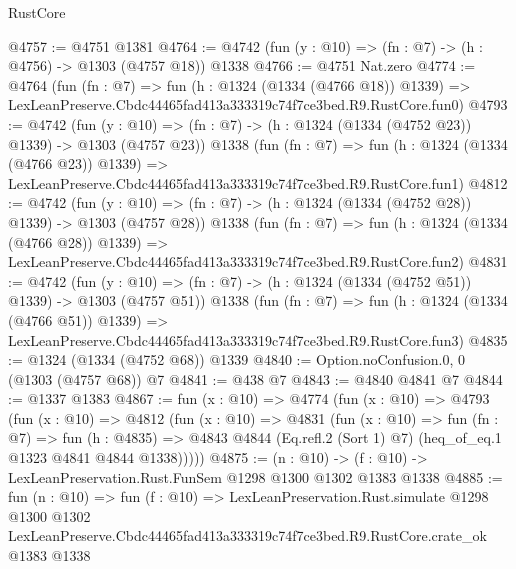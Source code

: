 \begin{lexlean}{RustCore}
\begin{coremodule}
@4757 := @4751 @1381
@4764 := @4742 (fun (y : @10) => (fn : @7) -> (h : @4756) -> @1303 (@4757 @18)) @1338
@4766 := @4751 Nat.zero
@4774 := @4764
    (fun (fn : @7) =>
    fun (h : @1324 (@1334 (@4766 @18)) @1339) =>
    LexLeanPreserve.Cbdc44465fad413a333319c74f7ce3bed.R9.RustCore.fun0)
@4793 := @4742
    (fun (y : @10) => (fn : @7) -> (h : @1324 (@1334 (@4752 @23)) @1339) -> @1303 (@4757 @23))
    @1338
    (fun (fn : @7) =>
    fun (h : @1324 (@1334 (@4766 @23)) @1339) =>
    LexLeanPreserve.Cbdc44465fad413a333319c74f7ce3bed.R9.RustCore.fun1)
@4812 := @4742
    (fun (y : @10) => (fn : @7) -> (h : @1324 (@1334 (@4752 @28)) @1339) -> @1303 (@4757 @28))
    @1338
    (fun (fn : @7) =>
    fun (h : @1324 (@1334 (@4766 @28)) @1339) =>
    LexLeanPreserve.Cbdc44465fad413a333319c74f7ce3bed.R9.RustCore.fun2)
@4831 := @4742
    (fun (y : @10) => (fn : @7) -> (h : @1324 (@1334 (@4752 @51)) @1339) -> @1303 (@4757 @51))
    @1338
    (fun (fn : @7) =>
    fun (h : @1324 (@1334 (@4766 @51)) @1339) =>
    LexLeanPreserve.Cbdc44465fad413a333319c74f7ce3bed.R9.RustCore.fun3)
@4835 := @1324 (@1334 (@4752 @68)) @1339
@4840 := Option.noConfusion.{0, 0} (@1303 (@4757 @68)) @7
@4841 := @438 @7
@4843 := @4840 @4841 @7
@4844 := @1337 @1383
@4867 := fun (x : @10) =>
  @4774
    (fun (x : @10) =>
    @4793
      (fun (x : @10) =>
      @4812
        (fun (x : @10) =>
        @4831
          (fun (x : @10) =>
          fun (fn : @7) =>
          fun (h : @4835) =>
          @4843 @4844 (Eq.refl.{2} (Sort 1) @7) (heq_of_eq.{1} @1323 @4841 @4844 @1338)))))
@4875 := (n : @10) -> (f : @10) -> LexLeanPreservation.Rust.FunSem @1298 @1300 @1302 @1383 @1338
@4885 := fun (n : @10) =>
  fun (f : @10) =>
  LexLeanPreservation.Rust.simulate
    @1298
    @1300
    @1302
    LexLeanPreserve.Cbdc44465fad413a333319c74f7ce3bed.R9.RustCore.crate_ok
    @1383
    @1338
\end{coremodule}
\end{lexlean}
